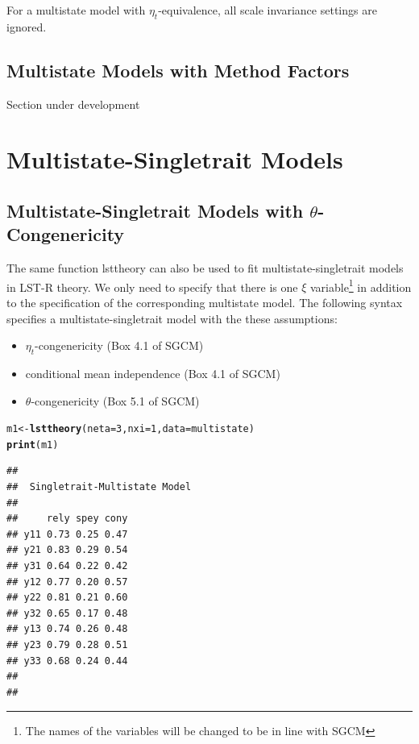 \documentclass[10pt]{article}\usepackage{graphicx, color}
\makeatletter
\newcommand{\hlfunctioncall}[1]{\textcolor[rgb]{0.501960784313725,0,0.329411764705882}{\textbf{#1}}}%
\newenvironment{kframe}{%
 \def\at@end@of@kframe{}%
 \ifinner\ifhmode%
  \def\at@end@of@kframe{\end{minipage}}%
  \begin{minipage}{\columnwidth}%
 \fi\fi%
 \def\FrameCommand##1{\hskip\@totalleftmargin \hskip-\fboxsep
 \colorbox{shadecolor}{##1}\hskip-\fboxsep
     \hskip-\linewidth \hskip-\@totalleftmargin \hskip\columnwidth}%
 \MakeFramed {\advance\hsize-\width
   \@totalleftmargin\z@ \linewidth\hsize
   \@setminipage}}%
 {\par\unskip\endMakeFramed%
 \at@end@of@kframe}
\newenvironment{knitrout}{}{} %
\makeatother
\begin{document}
%
For a multistate model with $\eta_t$-equivalence, all scale invariance settings are ignored.

\subsection{Multistate Models with Method Factors}

Section under development

\newpage
\section{Multistate-Singletrait Models}

\subsection{Multistate-Singletrait Models with $\theta$-Congenericity}

The same function lsttheory can also be used to fit multistate-singletrait models in LST-R theory. We only need to specify that there is one $\xi$ variable\footnote{The names of the variables will be changed to be in line with SGCM} in addition to the specification of the corresponding multistate model. The following syntax specifies a multistate-singletrait model with the these assumptions:
%
\begin{itemize}
  \item $\eta_t$-congenericity (Box 4.1 of SGCM)
  \item conditional mean independence (Box 4.1 of SGCM)
  \item $\theta$-congenericity (Box 5.1 of SGCM)
\end{itemize}
%
\begin{knitrout}
\color{fgcolor}\begin{kframe}
\begin{alltt}
m1 <- \hlfunctioncall{lsttheory}(neta = 3, nxi = 1, data = multistate)
\hlfunctioncall{print}(m1)
\end{alltt}
\begin{verbatim}
## 
##  Singletrait-Multistate Model 
##  
##     rely spey cony
## y11 0.73 0.25 0.47
## y21 0.83 0.29 0.54
## y31 0.64 0.22 0.42
## y12 0.77 0.20 0.57
## y22 0.81 0.21 0.60
## y32 0.65 0.17 0.48
## y13 0.74 0.26 0.48
## y23 0.79 0.28 0.51
## y33 0.68 0.24 0.44
## 
## 
\end{verbatim}
\end{kframe}
\end{knitrout}
\end{document}
